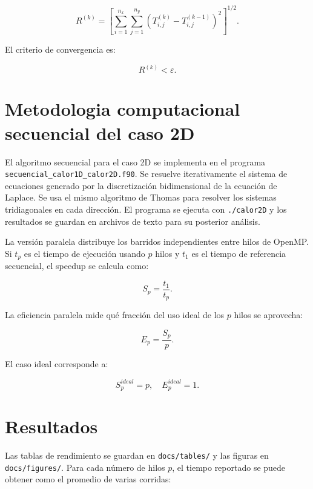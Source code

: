 \documentclass[11pt,a4paper]{article}
\begin{document}
\begin{equation}
R^{(k)}=
\left[
\sum_{i=1}^{n_x}\sum_{j=1}^{n_y}
\left(T_{i,j}^{(k)}-T_{i,j}^{(k-1)}\right)^2
\right]^{1/2}.
\end{equation}

El criterio de convergencia es:

\begin{equation}
R^{(k)}<\varepsilon.
\end{equation}

\section{Metodologia computacional secuencial del caso 2D}

El algoritmo secuencial para el caso 2D se implementa en el programa 
\texttt{secuencial\_calor1D\_calor2D.f90}. Se resuelve iterativamente el 
sistema de ecuaciones generado por la discretización bidimensional de la 
ecuación de Laplace. Se usa el mismo algoritmo de Thomas para resolver los 
sistemas tridiagonales en cada dirección. El programa se ejecuta con 
\verb|./calor2D| y los resultados se guardan en archivos de texto para su 
posterior análisis.

La versi\'on paralela distribuye los barridos independientes entre hilos de
OpenMP. Si $t_p$ es el tiempo de ejecuci\'on usando $p$ hilos y $t_1$ es el
tiempo de referencia secuencial, el speedup se calcula como:

\begin{equation}
S_p=\frac{t_1}{t_p}.
\end{equation}

La eficiencia paralela mide qu\'e fracci\'on del uso ideal de los $p$ hilos se
aprovecha:

\begin{equation}
E_p=\frac{S_p}{p}.
\end{equation}

El caso ideal corresponde a:

\begin{equation}
S_p^{ideal}=p,
\quad
E_p^{ideal}=1.
\end{equation}

\section{Resultados}

Las tablas de rendimiento se guardan en \texttt{docs/tables/} y las figuras en
\texttt{docs/figures/}. Para cada n\'umero de hilos $p$, el tiempo reportado se
puede obtener como el promedio de varias corridas:
\end{document}
